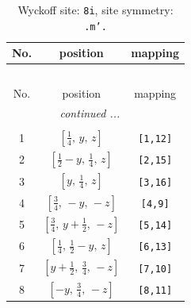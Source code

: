 \documentclass[fleqn,8pt]{jsarticle}
\begin{document}
\begin{longtable}{ccc}
\caption{Wyckoff site: {\tt 8i}, site symmetry: {\tt .m'.}}
 \\
 \hline \hline
No. & position & mapping \\ \hline \endfirsthead

\multicolumn{2}{l}{\tablename\ \thetable{}} \\
 \hline \hline
No. & position & mapping \\ \hline \endhead

 \hline \hline
\multicolumn{2}{r}{\footnotesize\it continued ...} \\ \endfoot

 \hline \hline
\multicolumn{2}{r}{} \\ \endlastfoot

1 & $\left[ \frac{1}{4},\, y,\, z \right]$ & {\tt [1,12]} \\ \hline
2 & $\left[ \frac{1}{2} - y,\, \frac{1}{4},\, z \right]$ & {\tt [2,15]} \\ \hline
3 & $\left[ y,\, \frac{1}{4},\, z \right]$ & {\tt [3,16]} \\ \hline
4 & $\left[ \frac{3}{4},\, - y,\, - z \right]$ & {\tt [4,9]} \\ \hline
5 & $\left[ \frac{3}{4},\, y + \frac{1}{2},\, - z \right]$ & {\tt [5,14]} \\ \hline
6 & $\left[ \frac{1}{4},\, \frac{1}{2} - y,\, z \right]$ & {\tt [6,13]} \\ \hline
7 & $\left[ y + \frac{1}{2},\, \frac{3}{4},\, - z \right]$ & {\tt [7,10]} \\ \hline
8 & $\left[ - y,\, \frac{3}{4},\, - z \right]$ & {\tt [8,11]} \\
\end{longtable}
\renewcommand{\arraystretch}{1.2}
\end{document}
